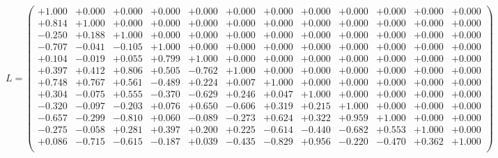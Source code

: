 \documentclass[9pt]{article}
\theoremstyle{plain}
\theoremstyle{definition}
\theoremstyle{remark}
\numberwithin{equation}{section}
\begin{document}
$L = \left(
\begin{array}{
cccccccccccc}
+1.000 & +0.000 & +0.000 & +0.000 & +0.000 & +0.000 & +0.000 & +0.000 & +0.000 & +0.000 & +0.000 & +0.000 \\
+0.814 & +1.000 & +0.000 & +0.000 & +0.000 & +0.000 & +0.000 & +0.000 & +0.000 & +0.000 & +0.000 & +0.000 \\
-0.250 & +0.188 & +1.000 & +0.000 & +0.000 & +0.000 & +0.000 & +0.000 & +0.000 & +0.000 & +0.000 & +0.000 \\
-0.707 & -0.041 & -0.105 & +1.000 & +0.000 & +0.000 & +0.000 & +0.000 & +0.000 & +0.000 & +0.000 & +0.000 \\
+0.104 & -0.019 & +0.055 & +0.799 & +1.000 & +0.000 & +0.000 & +0.000 & +0.000 & +0.000 & +0.000 & +0.000 \\
+0.397 & +0.412 & +0.806 & +0.505 & -0.762 & +1.000 & +0.000 & +0.000 & +0.000 & +0.000 & +0.000 & +0.000 \\
+0.748 & +0.767 & +0.561 & -0.489 & +0.224 & +0.007 & +1.000 & +0.000 & +0.000 & +0.000 & +0.000 & +0.000 \\
+0.304 & -0.075 & +0.555 & -0.370 & -0.629 & +0.246 & +0.047 & +1.000 & +0.000 & +0.000 & +0.000 & +0.000 \\
-0.320 & -0.097 & -0.203 & +0.076 & +0.650 & -0.606 & +0.319 & +0.215 & +1.000 & +0.000 & +0.000 & +0.000 \\
-0.657 & -0.299 & -0.810 & +0.060 & -0.089 & -0.273 & +0.624 & +0.322 & +0.959 & +1.000 & +0.000 & +0.000 \\
-0.275 & -0.058 & +0.281 & +0.397 & +0.200 & +0.225 & -0.614 & -0.440 & -0.682 & +0.553 & +1.000 & +0.000 \\
+0.086 & -0.715 & -0.615 & -0.187 & +0.039 & -0.435 & -0.829 & +0.956 & -0.220 & -0.470 & +0.362 & +1.000 \\
\end{array}
\right)$ \newline 
\end{document}
